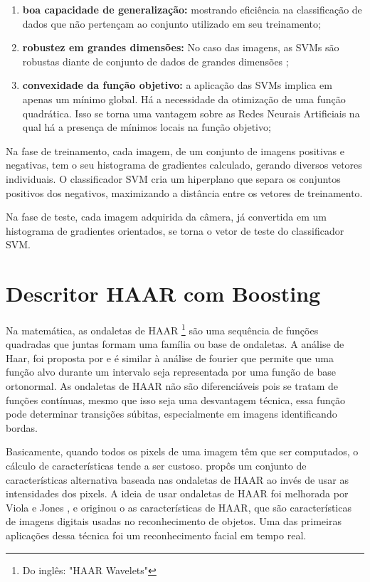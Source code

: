 \begin{enumerate}
	\item \textbf{boa capacidade de generalização:}  mostrando eficiência na classificação de dados que não pertençam ao conjunto utilizado em seu treinamento;

	\item \textbf{robustez em grandes dimensões:} No caso das imagens, as SVMs são robustas diante de conjunto de dados de grandes dimensões \cite{Ana};

	\item \textbf{convexidade da função objetivo:} a aplicação das SVMs implica em apenas um mínimo global. Há a necessidade da otimização de uma função quadrática. Isso se torna uma vantagem sobre as Redes Neurais Artificiais na qual há a presença de mínimos locais na função objetivo;

\end{enumerate}
	
Na fase de treinamento, cada imagem, de um conjunto de imagens positivas e negativas, tem o seu histograma de gradientes calculado, gerando diversos vetores individuais. O classificador SVM cria um hiperplano que separa os conjuntos positivos dos negativos, maximizando a distância entre os vetores de treinamento.

Na fase de teste, cada imagem adquirida da câmera, já convertida em um histograma de gradientes orientados, se torna o vetor de teste do classificador SVM. 


\section{Descritor HAAR com Boosting }

Na matemática, as ondaletas de HAAR \footnote{Do inglês: "HAAR Wavelets"} são uma sequência de funções quadradas que juntas formam uma família ou base de ondaletas. A análise de Haar, foi proposta por  e é similar à análise de fourier que permite que uma função alvo durante um intervalo seja representada por uma função de base ortonormal. As ondaletas de HAAR não são diferenciáveis pois se tratam de funções contínuas, mesmo que isso seja uma desvantagem técnica, essa função pode determinar transições súbitas, especialmente em imagens identificando bordas. 

Basicamente, quando todos os pixels de uma imagem têm que ser computados, o cálculo de características tende a ser custoso.  propôs um conjunto de características alternativa baseada nas ondaletas de HAAR ao invés de usar as intensidades dos pixels. A ideia de usar ondaletas de HAAR foi melhorada por Viola e Jones \cite{Viola}, e originou o as características de HAAR, que são características de imagens digitais usadas no reconhecimento de objetos. Uma das primeiras aplicações dessa técnica foi um reconhecimento facial em tempo real.

